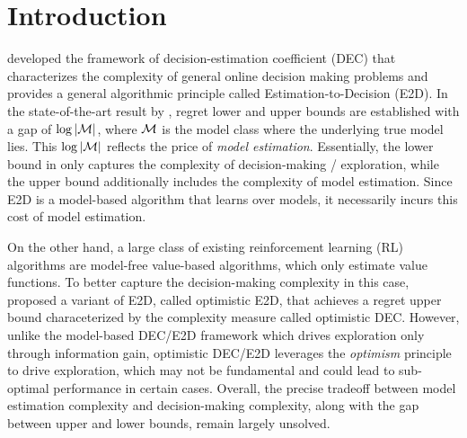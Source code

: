 \section{Introduction}\label{sec: intro}
\cite{foster2021statistical, foster2023tight} developed the framework of decision-estimation coefficient (DEC) that characterizes the complexity of general online decision making problems and provides a general algorithmic principle called Estimation-to-Decision (E2D). 
In the state-of-the-art result by \cite{foster2023tight}, regret lower and upper bounds are established with a gap of $\log|\mathcal{M}|$, where $\mathcal{M}$ is the model class where the underlying true model lies. This $\log|\mathcal{M}|$ reflects the price of \emph{model estimation}. 
Essentially, the lower bound in \cite{foster2023tight} only captures the complexity of decision-making / exploration, while the upper bound additionally includes the complexity of model estimation. 
Since E2D is a model-based algorithm that learns over models, it necessarily incurs this cost of model estimation. 

On the other hand, a large class of existing reinforcement learning (RL) algorithms are model-free value-based algorithms, which only estimate value functions. 
To better capture the decision-making complexity in this case, \citep{foster2024model} proposed a variant of E2D, called optimistic E2D, that achieves a regret upper bound characeterized by the complexity measure called optimistic DEC. However, unlike the model-based DEC/E2D framework \cite{foster2021statistical, foster2023tight} which drives exploration only through information gain, optimistic DEC/E2D leverages the \emph{optimism} principle to drive exploration, which may not be fundamental and could lead to sub-optimal performance in certain cases.  
Overall, the precise tradeoff between model estimation complexity and decision-making complexity, along with the gap between upper and lower bounds, remain largely unsolved. 


